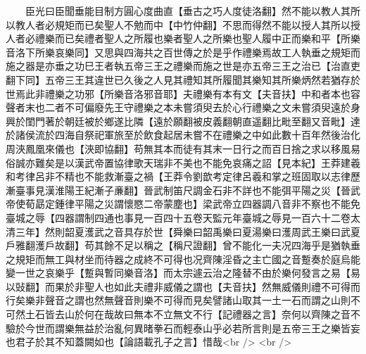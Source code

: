 　　臣光曰臣聞垂能目制方圓心度曲直【垂古之巧人度徒洛翻】然不能以教人其所以教人者必規矩而已矣聖人不勉而中【中竹仲翻】不思而得然不能以授人其所以授人者必禮樂而已矣禮者聖人之所履也樂者聖人之所樂也聖人履中正而樂和平【所樂音洛下所樂哀樂同】又思與四海共之百世傳之於是乎作禮樂焉故工人執垂之規矩而施之器是亦垂之功巳王者執五帝三王之禮樂而施之世是亦五帝三王之治已【治直吏翻下同】五帝三王其違世已久後之人見其禮知其所履聞其樂知其所樂炳然若猶存於世焉此非禮樂之功邪【所樂音洛邪音耶】夫禮樂有本有文【夫音扶】中和者本也容聲者末也二者不可偏廢先王守禮樂之本未嘗須臾去於心行禮樂之文未嘗須臾遠於身興於閨門著於朝廷被於鄉遂比隣【遠於願翻被皮義翻朝直遥翻比毗至翻又音毗】達於諸侯流於四海自祭祀軍旅至於飲食起居未嘗不在禮樂之中如此數十百年然後治化周浹鳳凰來儀也【浹即協翻】苟無其本而徒有其末一日行之而百日捨之求以移風易俗誠亦難矣是以漢武帝置協律歌天瑞非不美也不能免哀痛之詔【見本紀】王莽建羲和考律呂非不精也不能救漸臺之禍【王莽令劉歆考定律呂羲和掌之班固取以志律歷漸臺事見漢淮陽王紀漸子亷翻】晉武制笛尺調金石非不詳也不能弭平陽之災【晉武帝使荀勗定鍾律平陽之災謂懷愍二帝蒙塵也】梁武帝立四器調八音非不察也不能免臺城之辱【四器謂制四通也事見一百四十五卷天監元年臺城之辱見一百六十二卷太清三年】然則韶夏濩武之音具存於世【舜樂曰韶禹樂曰夏湯樂曰濩周武王樂曰武夏戶雅翻濩戶故翻】苟其餘不足以稱之【稱尺證翻】曾不能化一夫况四海乎是猶執垂之規矩而無工與材坐而待器之成終不可得也况齊陳淫昏之主亡國之音蹔奏於庭烏能變一世之哀樂乎【蹔與暫同樂音洛】而太宗遽云治之隆替不由於樂何發言之易【易以䜴翻】而果於非聖人也如此夫禮非威儀之謂也【夫音扶】然無威儀則禮不可得而行矣樂非聲音之謂也然無聲音則樂不可得而見矣譬諸山取其一土一石而謂之山則不可然土石皆去山於何在哉故曰無本不立無文不行【記禮器之言】奈何以齊陳之音不驗於今世而謂樂無益於治亂何異暏拳石而輕泰山乎必若所言則是五帝三王之樂皆妄也君子於其不知蓋闕如也【論語載孔子之言】惜哉<br />
<br />
